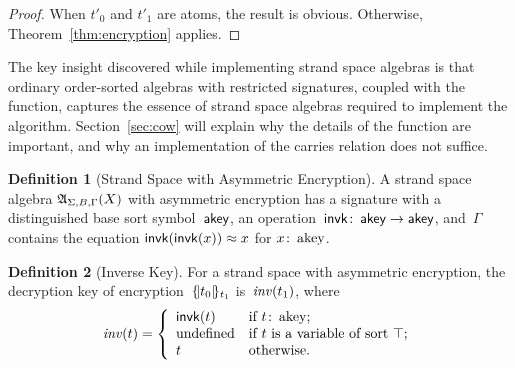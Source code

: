 \documentclass[12pt]{article}
\theoremstyle{definition}
\newtheorem{defn}{Definition}[section]
\begin{document}
\begin{proof}
When $t'_0$ and $t'_1$ are atoms, the result is obvious.  Otherwise,
Theorem~\ref{thm:encryption} applies.
\end{proof}

The key insight discovered while implementing strand space algebras is
that ordinary order-sorted algebras with restricted signatures,
coupled with the  function, captures the essence of strand
space algebras required to implement the {\cpsa} algorithm.
Section~\ref{sec:cow} will explain why the details of the 
function are important, and why an implementation of the carries
relation does not suffice.

\begin{defn}[Strand Space with Asymmetric Encryption]
A strand space algebra $\mathfrak A_{\Sigma,B,\Gamma}(X)$ with asymmetric
encryption has a signature with a distinguished base sort
symbol~$\operatorname{\mathsf{akey}}$, an
operation~$\operatorname{\mathsf{invk}}\colon\operatorname{\mathsf{akey}}\to\operatorname{\mathsf{akey}}$, and~$\Gamma$
contains the equation $\operatorname{\mathsf{invk}}(\operatorname{\mathsf{invk}}(x))\approx x$ for
$x\colon\operatorname{\mathrm{akey}}$.
\end{defn}

\begin{defn}[Inverse Key]
For a strand space with asymmetric encryption, the decryption key of
encryption~$\{\!|t_0|\!\}_{t_1}$ is~$\operatorname{\mathit{inv}}(t_1)$, where
$$\operatorname{\mathit{inv}}(t) =\left\{
\begin{array}{ll}
\operatorname{\mathsf{invk}}(t)&\mbox{if $t\colon\operatorname{\mathrm{akey}}$;}\\
\mbox{undefined}&\mbox{if $t$ is a variable of sort $\top$;}\\
t&\mbox{otherwise.}
\end{array}\right.$$
\end{defn}
\end{document}
